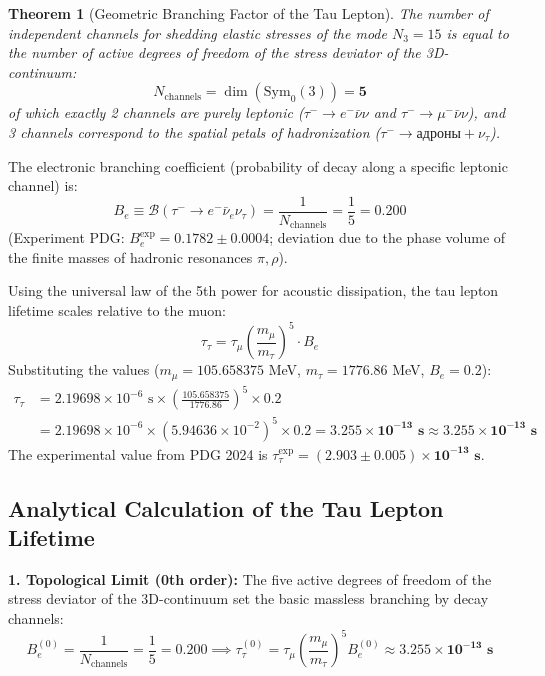 \documentclass[12pt,a4paper]{article}
\newtheorem{theorem}{Theorem}
\begin{document}
	\begin{theorem}[Geometric Branching Factor of the Tau Lepton]
			The number of independent channels for shedding elastic stresses of the mode $N_3=15$ is equal to the number of active degrees of freedom of the stress deviator of the 3D-continuum:
	\begin{equation}
		N_{\mathrm{channels}} = \dim(\mathrm{Sym}_0(3)) = \mathbf{5}
	\end{equation}
		of which exactly 2 channels are purely leptonic ($\tau^- \to e^-\bar{\nu}\nu$ and $\tau^- \to \mu^-\bar{\nu}\nu$), and 3 channels correspond to the spatial petals of hadronization ($\tau^- \to \mathrm{адроны} + \nu_\tau$).
	\end{theorem}
		
		The electronic branching coefficient (probability of decay along a specific leptonic channel) is:
		\begin{equation}
			B_e \equiv \mathcal{B}(\tau^- \to e^- \bar{\nu}_e \nu_\tau) = \frac{1}{N_{\text{channels}}} = \frac{1}{5} = \mathbf{0.200}
		\end{equation}
		(Experiment PDG: $B_e^{\text{exp}} = \mathbf{0.1782 \pm 0.0004}$; deviation due to the phase volume of the finite masses of hadronic resonances $\pi, \rho$).
		
		Using the universal law of the 5th power for acoustic dissipation, the tau lepton lifetime scales relative to the muon:
		\begin{equation}
			\tau_\tau = \tau_\mu \left( \frac{m_\mu}{m_\tau} \right)^5 \cdot B_e
		\end{equation}
		Substituting the values ($m_\mu = 105.658375$ MeV, $m_\tau = 1776.86$ MeV, $B_e = 0.2$):
		\begin{align}
			\tau_\tau &= 2.19698 \times 10^{-6} \text{ s} \times \left( \frac{105.658375}{1776.86} \right)^5 \times 0.2 \nonumber \\
			&= 2.19698 \times 10^{-6} \times (5.94636 \times 10^{-2})^5 \times 0.2 = \mathbf{3.255 \times 10^{-13} \text{ s}} \approx \mathbf{3.255 \times 10^{-13} \text{ s}}
		\end{align}
		The experimental value from PDG 2024 is $\tau_\tau^{\text{exp}} = \mathbf{(2.903 \pm 0.005) \times 10^{-13} \text{ s}}$.
		
		\subsection{Analytical Calculation of the Tau Lepton Lifetime}
		\textbf{1. Topological Limit (0th order):}
		The five active degrees of freedom of the stress deviator of the 3D-continuum set the basic massless branching by decay channels:
		\begin{equation}
			B_e^{(0)} = \frac{1}{N_{\text{channels}}} = \frac{1}{5} = \mathbf{0.200} \implies \tau_\tau^{(0)} = \tau_\mu \left(\frac{m_\mu}{m_\tau}\right)^5 B_e^{(0)} \approx \mathbf{3.255 \times 10^{-13} \text{ s}}
		\end{equation}
		
\end{document}
